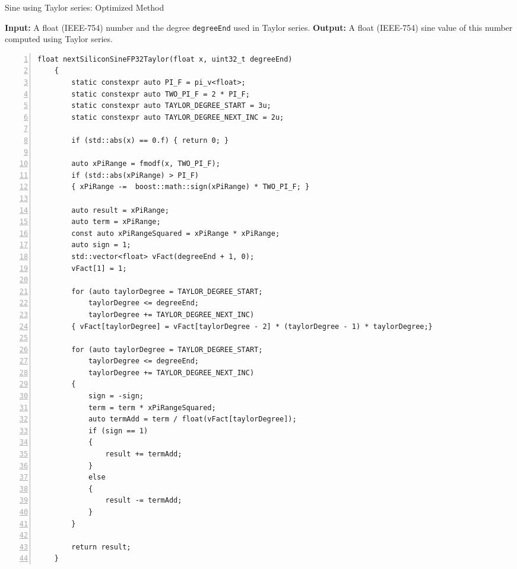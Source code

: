 
\begin{algorithm}
    \caption{Sine using Taylor series: Optimized Method}
    \begin{algorithmic}[1]
    \State \textbf{Input:} A float (IEEE-754) number and the degree \texttt{degreeEnd} used in Taylor series.
    \State \textbf{Output:} A float (IEEE-754) sine value of this number computed using Taylor series.
\begin{lstlisting}[numbers=left]
    float nextSiliconSineFP32Taylor(float x, uint32_t degreeEnd)
    {
        static constexpr auto PI_F = pi_v<float>;
        static constexpr auto TWO_PI_F = 2 * PI_F;
        static constexpr auto TAYLOR_DEGREE_START = 3u;
        static constexpr auto TAYLOR_DEGREE_NEXT_INC = 2u;

        if (std::abs(x) == 0.f) { return 0; }

        auto xPiRange = fmodf(x, TWO_PI_F);
        if (std::abs(xPiRange) > PI_F)
        { xPiRange -=  boost::math::sign(xPiRange) * TWO_PI_F; }

        auto result = xPiRange;
        auto term = xPiRange;
        const auto xPiRangeSquared = xPiRange * xPiRange;
        auto sign = 1;
        std::vector<float> vFact(degreeEnd + 1, 0);
        vFact[1] = 1;

        for (auto taylorDegree = TAYLOR_DEGREE_START;
            taylorDegree <= degreeEnd;
            taylorDegree += TAYLOR_DEGREE_NEXT_INC)
        { vFact[taylorDegree] = vFact[taylorDegree - 2] * (taylorDegree - 1) * taylorDegree;}

        for (auto taylorDegree = TAYLOR_DEGREE_START;
            taylorDegree <= degreeEnd;
            taylorDegree += TAYLOR_DEGREE_NEXT_INC)
        {
            sign = -sign;
            term = term * xPiRangeSquared;
            auto termAdd = term / float(vFact[taylorDegree]);
            if (sign == 1)
            {
                result += termAdd;
            }
            else
            {
                result -= termAdd;
            }
        }

        return result;
    }

\end{lstlisting}
\end{algorithmic}
 \label{alg:tay_optimized}
\end{algorithm}